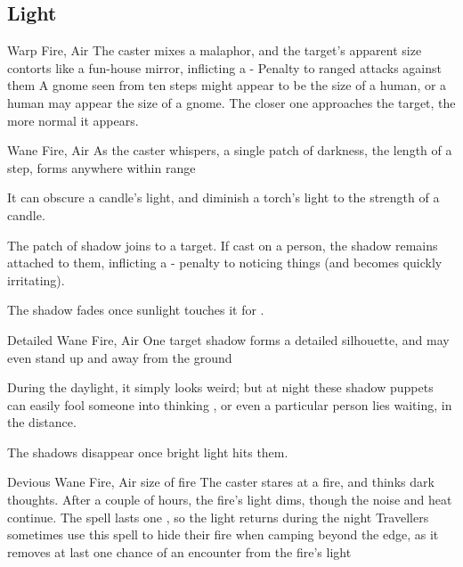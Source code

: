 \begin{multicols}{2}

\subsection{Light}

  {}%
  {Warp}%
  {Fire, Air}%
  {}%
  {The caster mixes a malaphor, and the target's apparent size contorts like a fun-house mirror, inflicting a - Penalty to ranged attacks against them}%
  {A gnome seen from ten steps might appear to be the size of a human, or a human may appear the size of a gnome.
    The closer one approaches the target, the more normal it appears.}



  {}%
  {Wane}%
  {Fire, Air}%
  {}%
  {As the caster whispers, a single patch of darkness, the length of a step, forms anywhere within range}%
  {It can obscure a candle's light, and diminish a torch's light to the strength of a candle.

    The patch of shadow joins to a target.
    If cast on a person, the shadow remains attached to them, inflicting a - penalty to noticing things (and becomes quickly irritating).

    The shadow fades once sunlight touches it for .}





  {Detailed}%
  {Wane}%
  {Fire, Air}%
  {}%
  {One target shadow forms a detailed silhouette, and may even stand up and away from the ground}%
  {During the daylight, it simply looks weird; but at night these shadow puppets can easily fool someone into thinking , or even a particular person lies waiting, in the distance.

  The shadows disappear once bright light hits them.}

  {Devious}%
  {Wane}%
  {Fire, Air}%
  {size of fire}%
  {The caster stares at a fire, and thinks dark thoughts.
  After a couple of hours, the fire's light dims, though the noise and heat continue.
  The spell lasts one \showOnset, so the light returns during the night}%
  {Travellers sometimes use this spell to hide their fire when camping beyond the \gls{edge}, as it removes at last one chance of an encounter from the fire's light}



\end{multicols}
